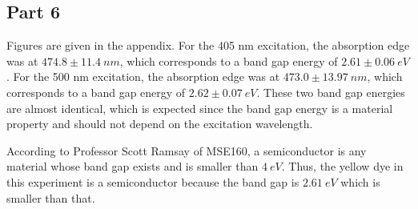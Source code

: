 \subsection{Part 6}


Figures are given in the appendix. For the 405 nm excitation, the absorption edge was at $474.8 \pm 11.4 ~nm$, which corresponds to a band gap energy of $2.61 \pm 0.06 ~eV$. For the 500 nm excitation, the absorption edge was at $473.0 \pm 13.97~nm$, which corresponds to a band gap energy of $2.62 \pm 0.07 ~eV$. These two band gap energies are almost identical, which is expected since the band gap energy is a material property and should not depend on the excitation wavelength.

According to Professor Scott Ramsay of MSE160, a semiconductor is any material whose band gap exists and is smaller than $4~eV$. Thus, the yellow dye in this experiment is a semiconductor because the band gap is $2.61 ~eV$ which is smaller than that.